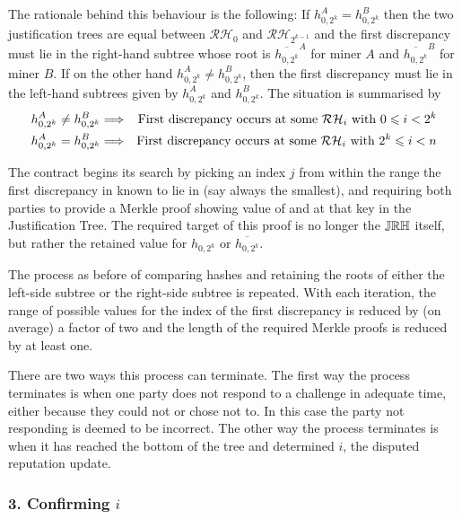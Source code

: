 The rationale behind this behaviour is the following: If $h_{0,2^k}^A = h_{0,2^k}^B$ then the two justification trees are equal between $\mathcal{RH}_0$ and $\mathcal{RH}_{2^{k-1}}$ and the first discrepancy must lie in the right-hand subtree whose root is $\overline{h_{0,2^k}}^A$ for miner $A$ and $\overline{h_{0,2^k}}^B$ for miner $B$. If on the other hand $h_{0,2^k}^A \neq h_{0,2^k}^B$, then the first discrepancy must lie in the left-hand subtrees given by $h_{0,2^k}^A$ and $h_{0,2^k}^B$. The situation is summarised by
\begin{eqnarray*}
 h_{0,2^k}^A \neq h_{0,2^k}^B & \Longrightarrow & \textnormal{First discrepancy occurs at some } \mathcal{RH}_i \textnormal{ with } 0 \leqslant i < 2^k\\
 h_{0,2^k}^A = h_{0,2^k}^B & \Longrightarrow & \textnormal{First discrepancy occurs at some } \mathcal{RH}_i \textnormal{ with } 2^k \leqslant i < n
\end{eqnarray*}

The contract begins its search by %
%
picking an index $j$ from within the range the first discrepancy in known to lie in (say always the smallest), and requiring both parties to provide a Merkle proof showing value of  and  at that key in the Justification Tree. The required target of this proof is no longer the $\mathbb{JRH}$ itself, but rather the retained value for $h_{0,2^k}$ or $\overline{h_{0,2^k}}$.

The process as before of comparing hashes and retaining the roots of either the left-side subtree or the right-side subtree is repeated. With each iteration, the range of possible values for the index of the first discrepancy is reduced by (on average) a factor of two and the length of the required Merkle proofs is reduced by at least one.

There are two ways this process can terminate. The first way the process terminates is when one party does not respond to a challenge in adequate time, either because they could not or chose not to. In this case the party not responding is deemed to be incorrect. The other way the process terminates is when it has reached the bottom of the tree and determined $i$, the disputed reputation update.

\subsubsection*{3. Confirming $i$ }

